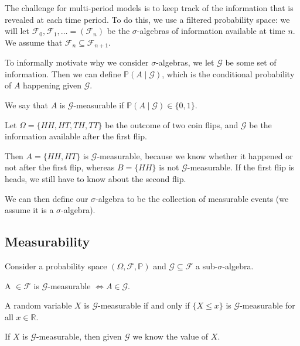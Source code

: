 \documentclass[12pt]{article}
\begin{document}
The challenge for multi-period models is to keep track of the information that is revealed at each time period. To do this, we use a filtered probability space: we will let $\mathcal{F}_0, \mathcal{F}_1, \ldots = (\mathcal{F}_n)$ be the $\sigma$-algebras of information available at time $n$. We assume that $\mathcal{F}_n \subseteq \mathcal{F}_{n+1}$.

To informally motivate why we consider $\sigma$-algebras, we let $\mathcal{G}$ be some set of information. Then we can define $\mathbb{P}(A \mid \mathcal{G})$, which is the conditional probability of $A$ happening given $\mathcal{G}$.

We say that $A$ is $\mathcal{G}$-measurable if $\mathbb{P}(A \mid \mathcal{G}) \in \{0, 1\}$.

\begin{exbox}
	Let $\Omega = \{HH, HT, TH, TT\}$ be the outcome of two coin flips, and $\mathcal{G}$ be the information available after the first flip.

	Then $A = \{HH, HT\}$ is $\mathcal{G}$-measurable, because we know whether it happened or not after the first flip, whereas $B = \{HH\}$ is not $\mathcal{G}$-measurable. If the first flip is heads, we still have to know about the second flip.
\end{exbox}

We can then define our $\sigma$-algebra to be the collection of measurable events (we assume it is a $\sigma$-algebra).

\subsection{Measurability}
\label{sub:meas}

Consider a probability space $(\Omega, \mathcal{F}, \mathbb{P})$ and $\mathcal{G} \subseteq \mathcal{F}$ a sub-$\sigma$-algebra.

\begin{definition}
	A $\in \mathcal{F}$ is $\mathcal{G}$-measurable $\iff A \in \mathcal{G}$.

	A random variable $X$ is $\mathcal{G}$-measurable if and only if $\{X \leq x\}$ is $\mathcal{G}$-measurable for all $x \in \mathbb{R}$.
\end{definition}

\begin{remark}
	If $X$ is $\mathcal{G}$-measurable, then given $\mathcal{G}$ we know the value of $X$.
\end{remark}
\end{document}
